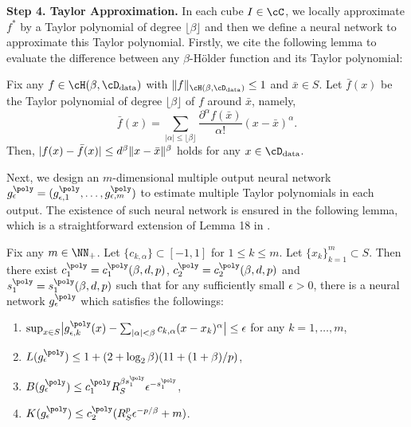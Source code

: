  
\textbf{Step 4. Taylor Approximation.} 
In each cube $I \in \cC$, we locally approximate $f^*$ by a Taylor polynomial of degree $\lfloor\beta\rfloor$ and then we define a neural network to approximate this Taylor polynomial. Firstly, we cite the following lemma to evaluate the difference between any $\beta$-H\"{o}lder function and its Taylor polynomial:
\begin{lemma}\label{lemma: taylor_approx}
  Fix any $f \in \cH(\beta, \cD_{\rm data})$ with $\norm{f}_{\cH(\beta, \cD_{\rm data})} \leq 1$ and $\bar{x} \in S$.
  Let $\bar{f}(x)$ be the Taylor polynomial of degree $\lfloor\beta\rfloor$ of $f$ around $\bar{x}$, namely,
  \begin{equation*}
    \bar{f}(x) = \sum_{ |\alpha| \leq \lfloor\beta\rfloor} \frac{\partial^\alpha f(\bar{x})}{\alpha!} (x - \bar{x})^\alpha.
  \end{equation*}
  Then, $|f(x) - \bar{f}(x)| \leq d^\beta \|x - \bar{x}\|^\beta$ holds for any $x \in \cD_{\rm data} $.%
\end{lemma}

Next, we design an $m$-dimensional multiple output neural network $g^{\poly}_\epsilon=(g^{\poly}_{\epsilon,1},\dots,g^{\poly}_{\epsilon,m})$ to estimate multiple Taylor polynomials in each output. The existence of such neural network is ensured in the following lemma, which is a straightforward extension of Lemma 18 in \citet{nakada2020adaptive}.

\begin{lemma}\label{lemma:poly}
  Fix any $m \in \NN_+$. Let $\{c_{k, \alpha}\} \subset [-1, 1]$ for $1 \leq k \leq m$. Let $\{x_k\}_{k=1}^m \subset S$.
  Then there exist $c_1^{\poly} = c_1^{\poly}(\beta, d, p)$, $c_2^{\poly} = c_2^{\poly}(\beta, d, p)$ and $s^{\poly}_1 = s^{\poly}_1(\beta, d, p)$  such that for any sufficiently small $\epsilon>0$, there is a neural network $g^{\poly}_\epsilon$ which satisfies the followings:
  \begin{enumerate}%
    \item $\sup_{x \in S} \bigl| g^{\poly}_{\epsilon,k}(x) - \sum_{|\alpha| < \beta} c_{k, \alpha} (x - x_k)^\alpha \bigr| \leq \epsilon$ for any $k=1,\ldots,m$,
    \item $L(g^{\poly}_\epsilon) \leq 1 + (2 + {\log_2\beta})(11 + (1+\beta)/p)$,
    \item $B(g^{\poly}_\epsilon) \leq c_1^{\poly} R_S^{\beta s_1^{\poly}}\epsilon^{-s_1^{\poly}}$,
    \item $K(g^{\poly}_\epsilon) \leq c_2^{\poly} (R_S^p \epsilon^{-p/\beta} + m)$.
  \end{enumerate}
\end{lemma}

